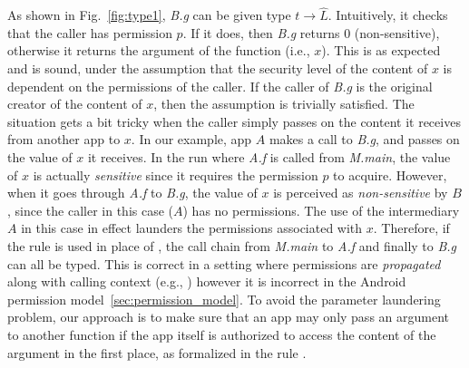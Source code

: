 {{{As shown in Fig.~\ref{fig:type1}, \textit{B.g} can be given type $t \rightarrow \hat{L}$. Intuitively, it checks that the
caller has permission $p$. If it does, then \textit{B.g} returns 0 (non-sensitive), otherwise it returns the
argument of the function (i.e., $x$). This is as expected and is sound, under the assumption that the security level of
the content of $x$ is dependent on the permissions of the caller. If the caller of \textit{B.g} is the original creator of the content of $x$,
then the assumption is trivially satisfied. The situation gets a bit tricky when the caller simply passes on the content  it
receives from another app to $x$. In our example, app $A$ makes a call to \textit{B.g}, and passes on the value of $x$ it receives.
In the run where \textit{A.f} is called from \textit{M.main}, the value of $x$ is actually \emph{sensitive} since it requires the permission $p$ to acquire.
However, when it goes through \textit{A.f} to \textit{B.g}, the value of $x$ is perceived as \emph{non-sensitive} by $B$, since
the caller in this case ($A$) has no permissions. The use of the intermediary $A$ in this case in effect launders the permissions
associated with $x.$
Therefore, if the rule  is used in place of , the call chain
from \textit{M.main} to \textit{A.f} and finally to \textit{B.g} can
all be typed.
This is correct in a setting where permissions are \emph{propagated}
along with calling context (e.g., \cite{Banerjee:2005ht}) however it
is incorrect in the Android permission model~\ref{sec:permission_model}. 
To avoid the parameter laundering problem, our approach is to make sure that an app may only pass an argument
to another function if the app itself is authorized to access the content of the argument in the first place,
as formalized in the rule .

\begin{figure*}[ht]
\end{figure*}}}}
